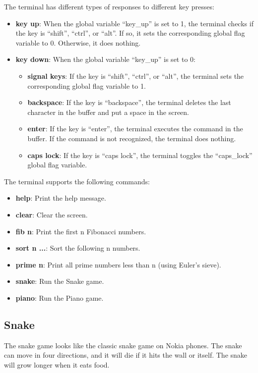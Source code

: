 \documentclass[
	a4paper, %
	11pt, %
]{CSUniSchoolLabReport}
\begin{document}
The terminal has different types of responses to different key presses:
\begin{itemize}
    \item \textbf{key up}: When the global variable ``key\_up'' is set to 1, the terminal checks if the key is ``shift'', ``ctrl'', or ``alt''. If so, it sets the corresponding global flag variable to 0. Otherwise, it does nothing.
    \item \textbf{key down}: When the global variable ``key\_up'' is set to 0:
          \begin{itemize}
              \item \textbf{signal keys}: If the key is ``shift'', ``ctrl'', or ``alt'', the terminal sets the corresponding global flag variable to 1.
              \item \textbf{backspace}: If the key is ``backspace'', the terminal deletes the last character in the buffer and put a space in the screen.
              \item \textbf{enter}: If the key is ``enter'', the terminal executes the command in the buffer. If the command is not recognized, the terminal does nothing.
              \item \textbf{caps lock}: If the key is ``caps lock'', the terminal toggles the ``caps\_lock'' global flag variable.
          \end{itemize}
\end{itemize}
The terminal supports the following commands:
\begin{itemize}
    \item \textbf{help}: Print the help message.
    \item \textbf{clear}: Clear the screen.
    \item \textbf{fib n}: Print the first n Fibonacci numbers.
    \item \textbf{sort n ...}: Sort the following n numbers.
    \item \textbf{prime n}: Print all prime numbers less than n (using Euler's sieve).
    \item \textbf{snake}: Run the Snake game.
    \item \textbf{piano}: Run the Piano game.
\end{itemize}
\subsection{Snake}
The snake game looks like the classic snake game on Nokia phones. The snake can move in four directions, and it will die if it hits the wall or itself. The snake will grow longer when it eats food.
\end{document}
